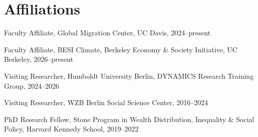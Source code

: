 \documentclass[letterpaper, 10pt]{article}
\newif\ifjobmarket
\renewenvironment{itemize}{
  \begin{list}{}{
    \setlength{\leftmargin}{0em}
  }
}{
  \end{list}
}
\begin{document}
\section*{Affiliations}
\begin{itemize}
  \item Faculty Affiliate, Global Migration Center, UC Davis, 2024--present
  \item Faculty Affiliate, BESI Climate, Berkeley Economy \& Society Initiative, UC Berkeley, 2026--present
  \item Visiting Researcher, Humboldt University Berlin, DYNAMICS Research Training Group, 2024--2026
  \item Visiting Researcher, WZB Berlin Social Science Center, 2016--2024
  \item PhD Research Fellow, Stone Program in Wealth Distribution, Inequality \& Social Policy, Harvard Kennedy School, 2019--2022
  \ifjobmarket
  \item Graduate Student Affiliate, Center for European Studies, Harvard University, 2018--2022
  \item Graduate Student Affiliate, Institute for Quantitative Social Science, Harvard University, 2017--2022
  \fi
\end{itemize}
\fi


\vspace*{-0.1cm}
\end{document}
